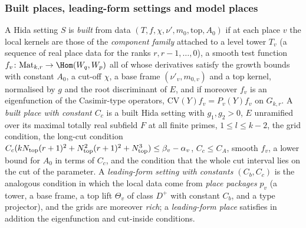 \subsubsection{Built places, leading-form settings and model places}\label{sec:pf:thmS-carrier:built-defs}
\begin{definition}\label{pf:thmS-carrier:builtdef}
A Hida setting $S$ is \emph{built} from data $(T,f,\chi,\nu',m_0,\mathrm{top},A_0)$ if at each place $v$ the local kernels
are those of the \emph{component family} attached to a level tower $T_v$ (a sequence of real place data for the ranks
$r,r-1,\dots,0$), a smooth test function $f_v\colon\mathrm{Mat}_{k,r}\to\Hom(W_q,W_p)$ all of whose derivatives satisfy
the growth bounds with constant $A_0$, a cut-off $\chi$, a base frame $(\nu'_v,m_{0,v})$ and a top kernel, normalised by
$g$ and the root discriminant of $E$, and if moreover $f_v$ is an eigenfunction of the Casimir-type operators,
$\mathrm{CV}(Y)f_v=P_v(Y)f_v$ on $G_{k,r}$. A \emph{built place with constant $C_c$} is a built Hida setting with
$g_1,g_2>0$, $E$ unramified over its maximal totally real subfield $F$ at all finite primes, $1\le l\le k-2$, the grid
condition, the long-cut condition
$C_c(kN_{\mathrm{top}}(r+1)^2+N_{\mathrm{top}}^2(r+1)^2+N_{\mathrm{top}}^3)\le\beta_v-\alpha_v$,
$C_c\le C_A$, smooth $f_v$, a lower bound for $A_0$ in terms of $C_c$, and the condition that the whole cut interval lies
on the cut of the parameter. A \emph{leading-form setting with constants $(C_b,C_c)$} is the analogous condition in
which the local data come from \emph{place packages} $p_v$ (a tower, a base frame, a top lift $\Theta_v$ of class
$D^+$ with constant $C_b$, and a type projector), and the grids are moreover \emph{rich}; a \emph{leading-form place}
satisfies in addition the eigenfunction and cut-inside conditions.
\end{definition}

